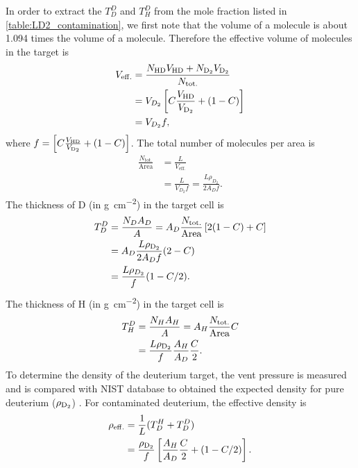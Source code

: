 \documentclass[../main.tex]{subfiles}
\begin{document}
In order to extract the $T_D^D$ and $T^D_H$ from the mole fraction listed in \cref{table:LD2_contamination},
we first note that the volume of a  molecule is about \num{1.094} times the volume of a 
molecule. Therefore the effective volume of molecules in the target is
\begin{equation}
	\begin{split}
		V_{\mathrm{eff.}}&=\frac{N_{\ce{HD}} V_{\ce{HD}} + N_{\ce{D_2}} V_{\ce{D_2}}}{N_{\text{tot.}}}\\
		&=V_{D_2} \left[ C \frac{V_{\ce{HD}}}{V_{\ce{D_2}}} + (1-C) \right]\\
		&=V_{D_2} f,
	\end{split}
\end{equation}
where $f=\left[ C \frac{V_{\ce{HD}}}{V_{\ce{D_2}}} + (1-C) \right]$.
The total number of molecules per area is
\begin{equation}
	\begin{split}
		\frac{N_{\mathrm{tot.}}}{\mathrm{Area}} &= \frac{L}{V_{\mathrm{eff.}}}\\
		&= \frac{L}{V_{D_2}f}=\frac{L\rho_{D_2}}{2A_Df}.
	\end{split}
\end{equation}
The thickness of D (in \unit{\g\per\cm\squared}) in the target cell is
\begin{equation}
	\begin{split}
		T_D^D &= \frac{N_D A_D}{A} = A_D\frac{N_{\mathrm{tot.}}}{\mathrm{Area}} \left[ 2(1-C) + C \right]\\
		&=A_D \frac{L\rho_{\ce{D_2}}}{2A_Df}(2-C)\\
		&=\frac{L\rho_{D_2}}{f}(1-C/2).
	\end{split}
\end{equation}
The thickness of H (in \unit{\g\per\cm\squared}) in the target cell is
\begin{equation}
	\begin{split}
		T^D_H &= \frac{N_H A_H}{A} = A_H\frac{N_{\mathrm{tot.}}}{\mathrm{Area}}C\\
		&=\frac{L\rho_{\ce{D_2}}}{f}\frac{A_H}{A_D}\frac{C}{2}.
	\end{split}
	\label{eq:TDH}
\end{equation}
To determine the density of the deuterium target, the vent pressure is measured and is compared
with NIST database to obtained the expected density for pure deuterium ($\rho_{\ce{D_2}}$) \cite{density-1453}.
For contaminated deuterium, the effective density is
\begin{equation}
	\begin{split}
		\rho_{\mathrm{eff.}} &= \frac{1}{L} (T_D^H + T_D^D)\\
		&=\frac{\rho_{\ce{D_2}}}{f} \left[ \frac{A_H}{A_D}\frac{C}{2}+(1-C/2) \right].
	\end{split}
\end{equation}
\end{document}

